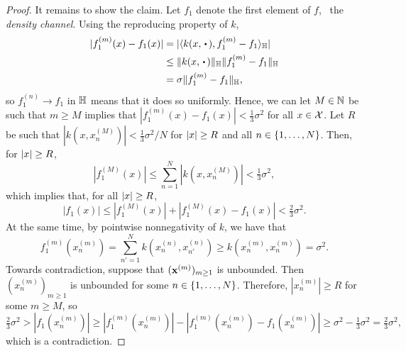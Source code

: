 \documentclass[12pt, twoside]{report}
\begin{document}
\begin{proof}
    It remains to show the claim. Let $f_1$ denote the first element of $f$, \ie~the \emph{density channel}.
    Using the reproducing property of $k$,
    \begin{align}
        |f^{(m)}_1(x) - f_1(x)|
        &= |\langle k(x, \vardot), f^{(m)}_1 - f_1\rangle_\Hb| \\
        &\le \|k(x, \vardot)\|_{\Hb} \|f_1^{(m)} - f_1\|_{\Hb} \\
        &= \sigma \|f_1^{(m)} - f_1\|_{\Hb},
    \end{align}
    so $f_1^{(n)} \to f_1$ in $\mathbb{H}$ means that it does so uniformly.
    Hence, we can let $M \in \mathbb{N}$ be such that $m \ge M$ implies that $|f^{(m)}_1(x) - f_1(x)| < \tfrac13 \sigma^2$ for all $x \in \mathcal{X}$.
    Let $R$ be such that $\displaystyle|k(x, x^{(M)}_n)| < \tfrac13 \sigma^2 / N$ for $\lvert x\rvert \ge R$ and all $n \in \{1, \ldots, N\}$. 
    Then, for $\lvert x\rvert \ge R$,
    \begin{equation}
        |f_1^{(M)}(x)|
        \le {\sum_{n=1}^N} |k(x, x^{(M)}_n)|
        < \tfrac13 \sigma^2,
    \end{equation}
    which implies that, for all $\lvert x\rvert \ge R$,
    \begin{equation}
        |f_1(x)| \le |f^{(M)}_1(x)| + |f^{(M)}_1(x) - f_1(x)| < \tfrac23 \sigma^2.
    \end{equation}
    At the same time, by pointwise nonnegativity of $k$, we have that
    \begin{equation}
        f_1^{(m)}(x^{(m)}_{n})
        = {\sum_{n'=1}^N} k(x^{(n)}_{n}, x^{(n)}_{n'})
        \ge k(x^{(m)}_n, x^{(m)}_n)
        = \sigma^2.
    \end{equation}
    Towards contradiction, suppose that $(\mathbf{x}^{(m)})_{m\ge1}$ is unbounded. 
    Then $\displaystyle(x^{(m)}_n)_{m\ge1}$ is unbounded for some $n \in \{1, \ldots, N\}$.
    Therefore, $\displaystyle|x_n^{(m)}| \ge R$ for some $m \ge M$, so
    \begin{equation}
        \tfrac23 \sigma^2
        > |f_1(x_n^{(m)})|
        \ge |f^{(m)}_1(x_n^{(m)})| - |f^{(m)}_1(x_n^{(m)}) - f_1(x_n^{(m)})|
        \ge \sigma^2 - \tfrac13 \sigma^2
        = \tfrac23 \sigma^2,
    \end{equation}
    which is a contradiction.
\end{proof}
\end{document}
